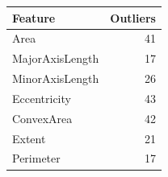 \begin{tabular}{lr}
\toprule
Feature & Outliers \\
\midrule
Area & 41 \\
MajorAxisLength & 17 \\
MinorAxisLength & 26 \\
Eccentricity & 43 \\
ConvexArea & 42 \\
Extent & 21 \\
Perimeter & 17 \\
\bottomrule
\end{tabular}
